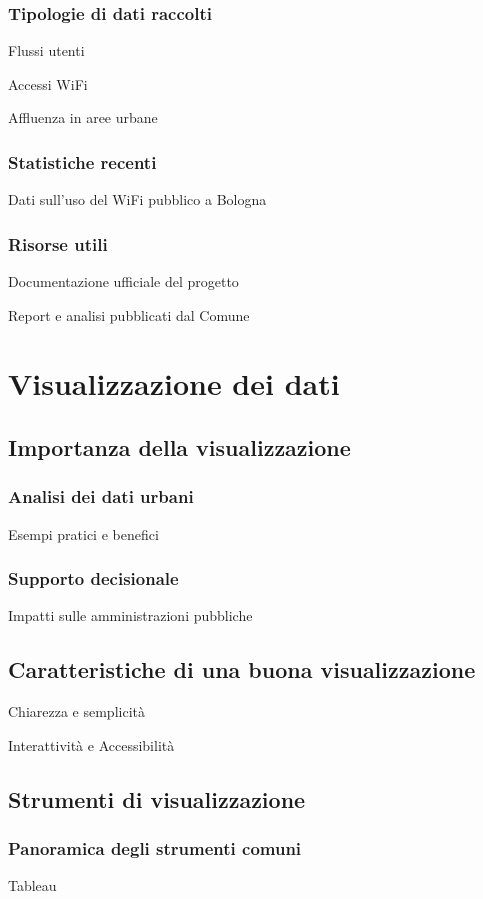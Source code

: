 \subsubsection{Tipologie di dati raccolti}
Flussi utenti

Accessi WiFi

Affluenza in aree urbane

\subsubsection{Statistiche recenti}
Dati sull'uso del WiFi pubblico a Bologna

\subsubsection{Risorse utili}
Documentazione ufficiale del progetto

Report e analisi pubblicati dal Comune


\section{Visualizzazione dei dati}  %
\subsection{Importanza della visualizzazione}
\subsubsection{Analisi dei dati urbani}
Esempi pratici e benefici

\subsubsection{Supporto decisionale}
Impatti sulle amministrazioni pubbliche

\subsection{Caratteristiche di una buona visualizzazione}
Chiarezza e semplicità

Interattività e Accessibilità

\subsection{Strumenti di visualizzazione}
\subsubsection{Panoramica degli strumenti comuni}
Tableau

